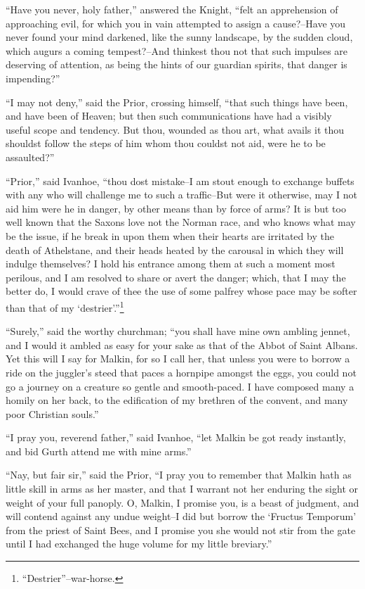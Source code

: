 ``Have you never, holy father,'' answered the Knight, ``felt an
apprehension of approaching evil, for which you in vain attempted to
assign a cause?--Have you never found your mind darkened, like the sunny
landscape, by the sudden cloud, which augurs a coming tempest?--And
thinkest thou not that such impulses are deserving of attention, as
being the hints of our guardian spirits, that danger is impending?''

``I may not deny,'' said the Prior, crossing himself, ``that such things
have been, and have been of Heaven; but then such communications have
had a visibly useful scope and tendency. But thou, wounded as thou art,
what avails it thou shouldst follow the steps of him whom thou couldst
not aid, were he to be assaulted?''

``Prior,'' said Ivanhoe, ``thou dost mistake--I am stout enough to
exchange buffets with any who will challenge me to such a traffic--But
were it otherwise, may I not aid him were he in danger, by other means
than by force of arms? It is but too well known that the Saxons love not
the Norman race, and who knows what may be the issue, if he break in
upon them when their hearts are irritated by the death of Athelstane,
and their heads heated by the carousal in which they will indulge
themselves? I hold his entrance among them at such a moment most
perilous, and I am resolved to share or avert the danger; which, that I
may the better do, I would crave of thee the use of some palfrey whose
pace may be softer than that of my
`destrier'.''\footnote{``Destrier''--war-horse.}

``Surely,'' said the worthy churchman; ``you shall have mine own ambling
jennet, and I would it ambled as easy for your sake as that of the Abbot
of Saint Albans. Yet this will I say for Malkin, for so I call her, that
unless you were to borrow a ride on the juggler's steed that paces a
hornpipe amongst the eggs, you could not go a journey on a creature so
gentle and smooth-paced. I have composed many a homily on her back, to
the edification of my brethren of the convent, and many poor Christian
souls.''

``I pray you, reverend father,'' said Ivanhoe, ``let Malkin be got ready
instantly, and bid Gurth attend me with mine arms.''

``Nay, but fair sir,'' said the Prior, ``I pray you to remember that
Malkin hath as little skill in arms as her master, and that I warrant
not her enduring the sight or weight of your full panoply. O, Malkin, I
promise you, is a beast of judgment, and will contend against any undue
weight--I did but borrow the `Fructus Temporum' from the priest of Saint
Bees, and I promise you she would not stir from the gate until I had
exchanged the huge volume for my little breviary.''

